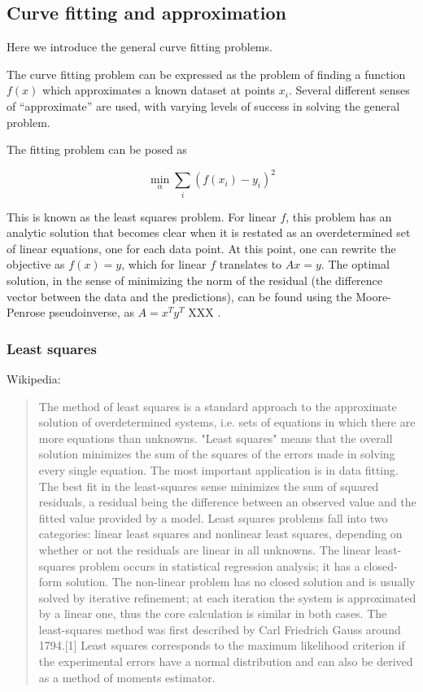 \subsection{Curve fitting and approximation}
Here we introduce the general curve fitting problems.

The curve fitting problem can be expressed as the problem of finding a function $f(x)$ which approximates a known dataset at points $x_i$.
Several different senses of ``approximate'' are used, with varying levels of success in solving the general problem.

The fitting problem can be posed as

\begin{equation}
  \label{eq:1}
  \min_{\alpha} \sum_i (f(x_i) - y_i)^2
\end{equation}

This is known as the least squares problem. For linear $f$, this problem has an analytic solution that becomes clear when it is restated as an overdetermined set of linear equations, one for each data point.
At this point, one can rewrite the objective as $f(x) = y$, which for linear $f$ translates to $Ax=y$.
The optimal solution, in the sense of minimizing the norm of the residual (the difference vector between the data and the predictions), can be found using the Moore-Penrose pseudoinverse, as $A = x^Ty^T$ XXX .


\subsubsection{Least squares}
Wikipedia:
\begin{quote}
  The method of least squares is a standard approach to the approximate solution of overdetermined systems, i.e. sets of equations in which there are more equations than unknowns.
 "Least squares" means that the overall solution minimizes the sum of the squares of the errors made in solving every single equation.
 The most important application is in data fitting.
 The best fit in the least-squares sense minimizes the sum of squared residuals, a residual being the difference between an observed value and the fitted value provided by a model.
  Least squares problems fall into two categories: linear least squares and nonlinear least squares, depending on whether or not the residuals are linear in all unknowns.
  The linear least-squares problem occurs in statistical regression analysis; it has a closed-form solution.
  The non-linear problem has no closed solution and is usually solved by iterative refinement; at each iteration the system is approximated by a linear one, thus the core calculation is similar in both cases.
  The least-squares method was first described by Carl Friedrich Gauss around 1794.[1]
  Least squares corresponds to the maximum likelihood criterion if the experimental errors have a normal distribution and can also be derived as a method of moments estimator.
\end{quote}

